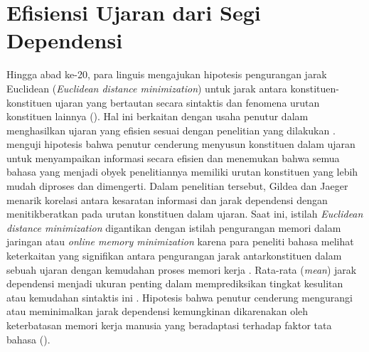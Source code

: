 \section{Efisiensi Ujaran dari Segi Dependensi}
Hingga abad ke-20, para linguis mengajukan hipotesis pengurangan jarak Euclidean (\textit{Euclidean distance minimization}) untuk jarak antara konstituen-konstituen ujaran yang bertautan secara sintaktis dan fenomena urutan konstituen lainnya (\citealp{i2004euclidean, ferrer2008some}). Hal ini berkaitan dengan usaha penutur dalam menghasilkan ujaran yang efisien sesuai dengan penelitian yang dilakukan \cite{gildea2015human}. \cite{gildea2015human} menguji hipotesis bahwa penutur cenderung menyusun konstituen dalam ujaran untuk menyampaikan informasi secara efisien dan menemukan bahwa semua bahasa yang menjadi obyek penelitiannya memiliki urutan konstituen yang lebih mudah diproses dan dimengerti. Dalam penelitian tersebut, Gildea dan Jaeger menarik korelasi antara kesaratan informasi dan jarak dependensi dengan menitikberatkan pada urutan konstituen dalam ujaran. Saat ini, istilah \textit{Euclidean distance minimization} digantikan dengan istilah pengurangan memori dalam jaringan atau \textit{online memory minimization} karena para peneliti bahasa melihat keterkaitan yang signifikan antara pengurangan jarak antarkonstituen dalam sebuah ujaran dengan kemudahan proses memori kerja \citep{ferrer2015placement}. Rata-rata (\textit{mean}) jarak dependensi menjadi ukuran penting dalam memprediksikan tingkat kesulitan atau kemudahan sintaktis ini \citep{hudson1995measuring}. Hipotesis bahwa penutur cenderung mengurangi atau meminimalkan jarak dependensi kemungkinan dikarenakan oleh keterbatasan memori kerja manusia yang beradaptasi terhadap faktor tata bahasa (\citealp{i2004euclidean, ferrer2016non, buch2006discontinuous, liu2008dependency, gildea2010grammars, futrell2015large}).

